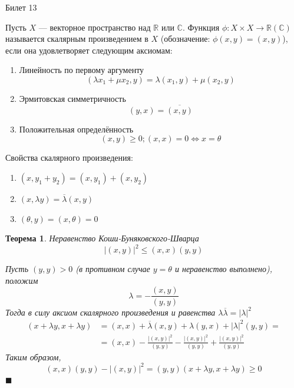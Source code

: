 \documentclass[12pt,a4paper]{article}
\newtheorem*{theorem*}{Теорема}
\begin{document}
\begin{center}
Билет 13
\end{center}

Пусть $X$ --- векторное пространство над $\mathbb{R}$ или $\mathbb{C}$. Функция $\phi: X \times X \rightarrow \mathbb{R} (\mathbb{C})$ называется скалярным произведением в $X$ (обозначение: $\phi(x, y) = (x, y)$), если она удовлетворяет следующим аксиомам:
\begin{enumerate}
\item Линейность по первому аргументу
$$
(\lambda x_1 + \mu x_2, y) = \lambda (x_1, y) + \mu (x_2, y)
$$

\item Эрмитовская симметричность
$$
(y, x) = \overline{(x, y)}
$$

\item Положительная определённость
$$
(x, y) \geq 0; (x, x) = 0 \Leftrightarrow x=\theta
$$
\end{enumerate}

Свойства скалярного произведения:
\begin{enumerate}
\item $(x, y_1 + y_2) = (x, y_1) + (x, y_2)$
\item $(x, \lambda y) = \overline{\lambda} (x, y)$
\item $(\theta, y) = (x, \theta) = 0$
\end{enumerate}

\begin{theorem*}{Неравенство Коши-Буняковского-Шварца}
\label{13.1}
$$
{|(x, y)|}^2 \leq (x, x) (y, y)
$$

Пусть $(y, y) > 0$ (в противном случае $y=\theta$ и неравенство выполнено), положим
$$
\lambda = -\frac{(x, y)}{(y, y)}
$$
Тогда в силу аксиом скалярного произведения и равенства $\lambda \overline{\lambda} = {|\lambda|}^2$
\begin{align*}
(x + \lambda y, x + \lambda y) &= (x, x) + \overline{\lambda} (x, y) + \lambda (y, x) + {|\lambda|}^2 (y, y) = \\
&=(x,x) -  \frac{{|(x, y)|}^2}{(y, y)}-\frac{{|(x, y)|}^2}{(y, y)}+\frac{{|(x, y)|}^2}{(y, y)}
\end{align*}
Таким образом,
$$
(x, x) (y, y) - {|(x, y)|}^2 = (y, y) (x + \lambda y, x+\lambda y) \geq 0
$$
$\blacksquare$
\end{theorem*}
\end{document}

